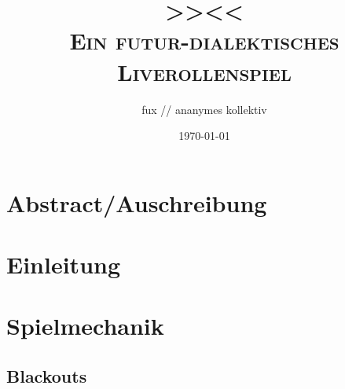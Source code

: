 \documentclass[12pt, a4paper, openany]{book}
\title{
  { \Large 
    \textbf{\textsc{>>\game<<}}\\
  }
  \vspace{0.4cm}
  { \large \color{gray}
    \textsc{Ein futur-dialektisches Liverollenspiel}
  }
}
\author{fux // ananymes kollektiv}
\date{{\small \today}}
\begin{document}
\frontmatter
\maketitle

\chapter*{Abstract/Auschreibung}


\tableofcontents



\mainmatter
\chapter{Einleitung}


\chapter{Spielmechanik}
\section{Blackouts}\label{sec:blackouts}
\end{document}
